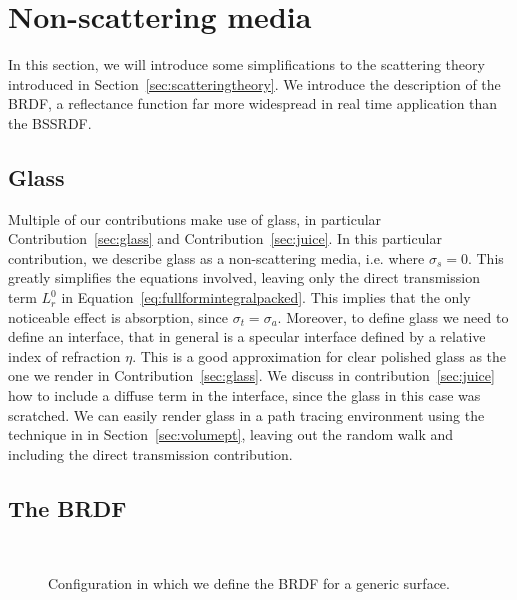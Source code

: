\section{Non-scattering media}
\label{sec:brdftheory}
In this section, we will introduce some simplifications to the scattering theory introduced in Section~\ref{sec:scatteringtheory}. We introduce the description of the BRDF, a reflectance function far more widespread in real time application than the BSSRDF.   

\subsection{Glass}
Multiple of our contributions make use of glass, in particular Contribution~\ref{sec:glass} and Contribution~\ref{sec:juice}. In this particular contribution, we describe glass as a non-scattering media, i.e. where $\sigma_s = 0$. This greatly simplifies the equations involved, leaving only the direct transmission term $L^0_r$ in Equation~\ref{eq:fullformintegralpacked}. This implies that the only noticeable effect is absorption, since $\sigma_t = \sigma_a$. Moreover, to define glass we need to define an interface, that in general is a specular interface defined by a relative index of refraction $\eta$. This is a good approximation for clear polished glass as the one we render in Contribution~\ref{sec:glass}. We discuss in contribution~\ref{sec:juice} how to include a diffuse term in the interface, since the glass in this case was scratched. We can easily render glass in a path tracing environment using the technique in in Section~\ref{sec:volumept}, leaving out the random walk and including the direct transmission contribution.

\subsection{The BRDF}
\label{sec:brdfsec}
\begin{figure}
\centering
   \def\svgwidth{0.8\textwidth}
    \\
\caption{Configuration in which we define the BRDF for a generic surface.} %
\label{fig:brdf_configuration}
\end{figure}

